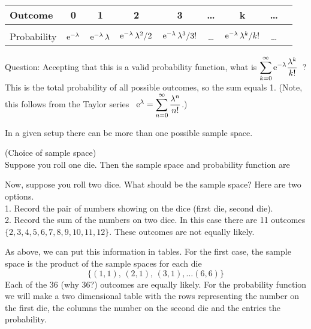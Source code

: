 \begin{tabular}{l|cccccccc}
Outcome    & 0 & 1 & 2 & 3 & \ldots & k & \ldots\\[.6ex]
\hline\\[-.9ex]
Probability & $\mathrm{e}^{-\lambda}$ & $\mathrm{e}^{-\lambda}\,\lambda$ 
& $\mathrm{e}^{-\lambda}\,\lambda^2/2$ & $\mathrm{e}^{-\lambda}\,\lambda^3/3!$
& \ldots & $\mathrm{e}^{-\lambda}\,\lambda^k/k!$ & \ldots
\end{tabular}

Question: Accepting that this is a valid probability function, what 
is $\displaystyle{\sum_{k=0}^\infty \mathrm{e}^{-\lambda}\frac{\lambda^k}{k!}}$ \,?\\
\ans This is the total probability of all possible outcomes, so the sum equals 1. (Note, this follows from the Taylor series \,
$\displaystyle{\mathrm{e}^{\lambda} = \sum_{n=0}^\infty \frac{\lambda^n}{n!}}$.)


\medskip

In a given setup there can be more than one possible sample space.

\numexamp (Choice of sample space)\\
Suppose you roll one die. Then the sample space and probability function are


Now, suppose you roll two dice. What should be the sample space? Here are two
options.\\
1. Record the pair of numbers showing on the dice (first die, second die). \\
2. Record the sum of the numbers on two dice. In this case there are
11 outcomes $\{2,3,4,5,6,7,8,9,10,11,12\}$. These outcomes are not equally
likely.

As above, we can put this information in tables. For the first case, the 
sample space is the product of the sample spaces for each die
\[ \{(1,1),\, (2,1),\, (3,1), \ldots (6,6)\}\]
Each of the 36 (why 36?) outcomes are equally likely. 
For the probability function we will
make a two dimensional table with the rows representing the number on the
first die, the columns the number on the second die and the entries the
probability.

